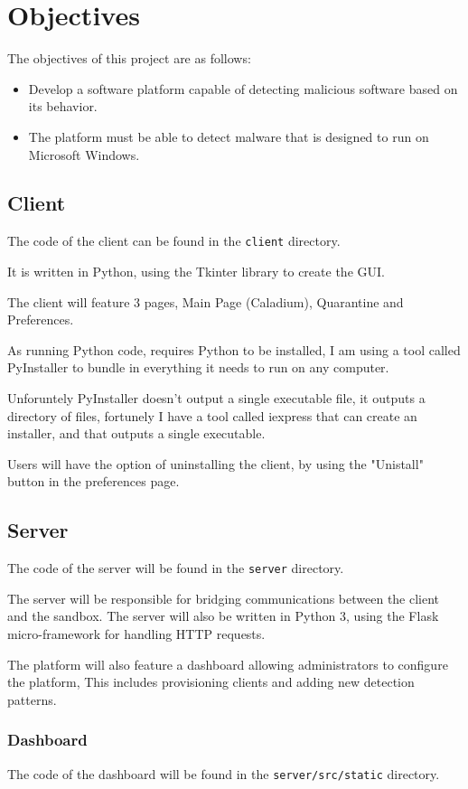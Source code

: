 \section{Objectives}
The objectives of this project are as follows:
\begin{itemize}
    \item Develop a software platform capable of detecting malicious software based on its behavior.
    \item The platform must be able to detect malware that is designed to run on Microsoft Windows.
\end{itemize}

\subsection{Client}
The code of the client can be found in the \texttt{client} directory.

It is written in Python, using the Tkinter library to create the GUI.

The client will feature 3 pages, Main Page (Caladium), Quarantine and Preferences.

As running Python code, requires Python to be installed,
I am using a tool called PyInstaller to bundle in everything it needs to run on any computer.

Unforuntely PyInstaller doesn't output a single executable file,
it outputs a directory of files, fortunely I have a tool called iexpress that can create an installer,
and that outputs a single executable.

Users will have the option of uninstalling the client, by using the "Unistall" button in the preferences page.

\subsection{Server}
The code of the server will be found in the \texttt{server} directory.

The server will be responsible for bridging communications between the client and the sandbox.
The server will also be written in Python 3, using the Flask micro-framework for handling HTTP requests.

The platform will also feature a dashboard allowing administrators to configure the platform,
This includes provisioning clients and adding new detection patterns.

\subsubsection{Dashboard}
The code of the dashboard will be found in the \texttt{server/src/static} directory.

